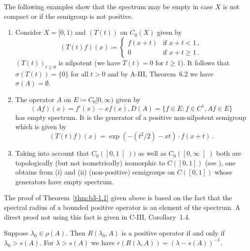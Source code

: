 The following examples show that the spectrum may be empty in case $X$ is not compact or if the semigroup is not positive.
\begin{examples}\label{ex:b3-1.2}
%

\begin{enumerate}[\upshape (i), wide, labelindent=.5em]	
\item  
Consider $X = [0,1)$ and $(T(t))$ on $C_{0}(X)$ given by
%
\begin{equation}\label{eq:b3-1.7}
	(T(t)f)(x) \coloneqq \begin{cases} 
		f(x+t) & \text{if } x+t < 1\,, \\
		0 & \text{if } x+t \geq 1\,.
	\end{cases}
\end{equation}
$(T(t))_{t\geq 0}$ is nilpotent (we have $T(t) = 0$ for $t \geq 1$).
It follows that $\sigma(T(t)) = \{0\}$ for all $t > 0$ and by A-III, Theorem~6.2 we have $\sigma(A) = \emptyset$.

\item 
The operator $A$ on $E \coloneqq C_{0}[0,\infty)$ given by
\begin{equation}\label{eq:b3-1.8}
	(Af)(x) = f'(x) - xf(x), D(A) = \{f \in E : f \in C^1, Af \in E\}
\end{equation}
has empty spectrum.
It is the generator of a positive non-nilpotent semigroup which is given by
\begin{equation}\label{eq:b3-1.9}
	(T(t)f)(x) = \exp(-(t^2/2) - xt) \cdot f(x+t)\,.
\end{equation}
	
\item 
Taking into account that $C_{0}(\left[0,1\right[))$ as well as 
$C_{0}(\left[0,\infty\right[)$ both are topologically (but not isometrically) isomorphic to $C(\left[0,1\right])$ (see \citet[Section~21.5]{semadeni:1971}), one obtains from (i) and (ii) (non-positive) semigroups on $C(\left[0,1\right])$ whose generators have empty spectrum.
\end{enumerate}
\end{examples}
The proof of Theorem~\ref{thm:b3-1.1} given above is based on the fact that the spectral radius of a bounded positive operator is an element of the spectrum.
A direct proof not using this fact is given in C-III, Corollary~1.4.
\begin{corollary}\label{cor:b3-1.3}
	Suppose $\lambda_0 \in \rho(A)$.
	Then $R(\lambda_0,A)$ is a positive operator if and only if $\lambda_0 > s(A)$.
	For $\lambda > s(A)$ we have $r(R(\lambda,A)) = (\lambda - s(A))^{-1}$.
\end{corollary}
